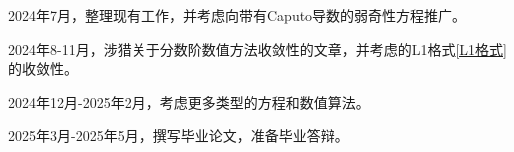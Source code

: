 2024年7月，整理现有工作，并考虑向带有Caputo导数的弱奇性方程推广。

2024年8-11月，涉猎关于分数阶数值方法收敛性的文章，并考虑\mainEquation 的L1格式\eqref{L1格式}的收敛性。

2024年12月-2025年2月，考虑更多类型的方程和数值算法。

2025年3月-2025年5月，撰写毕业论文，准备毕业答辩。